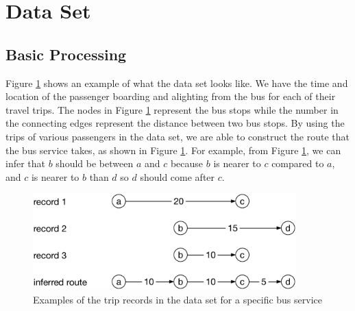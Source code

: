 \documentclass[10pt]{article}
\begin{document}



\section{Data Set}

\subsection{Basic Processing}

Figure \ref{fig:trip_example} shows an example of what the data set looks like. We have the time and location of the passenger boarding and alighting from the bus for each of their travel trips. The nodes in Figure \ref{fig:trip_example} represent the bus stops while the number in the connecting edges represent the distance between two bus stops. By using the trips of various passengers in the data set, we are able to construct the route that the bus service takes, as shown in Figure \ref{fig:trip_example}. For example, from Figure \ref{fig:trip_example}, we can infer that $b$ should be between $a$ and $c$ because $b$ is nearer to $c$ compared to $a$, and $c$ is nearer to $b$ than $d$ so $d$ should come after $c$.

\begin{figure}[htb]
	\centering
	\includegraphics[width=4.0in]{trip_example}
	\caption{Examples of the trip records in the data set for a specific bus service}
	\label{fig:trip_example}
\end{figure}
\end{document}
